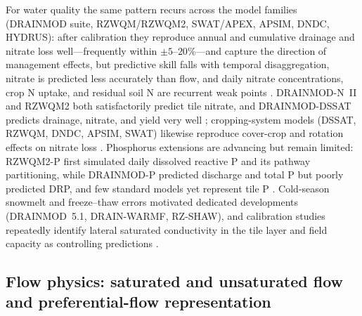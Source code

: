 \documentclass[11pt]{article}
\begin{document}
For water quality the same pattern recurs across the model families
(\textsc{DRAINMOD} suite, RZWQM/RZWQM2, SWAT/APEX, APSIM, DNDC, HYDRUS): after
calibration they reproduce annual and cumulative drainage and nitrate loss
well---frequently within $\pm5$--$20\%$---and capture the direction of
management effects, but predictive skill falls with temporal disaggregation,
nitrate is predicted less accurately than flow, and daily nitrate
concentrations, crop N uptake, and residual soil N are recurrent weak points
\parencite{Youssef2018,Negm2014,Singh2020b,Dayyani2010,Ma2001,Liang2018,Ikenberry2017,Marjerison2016,Ojeda2018,Qi2025,Ma2007,Ahuja2007}.
\textsc{DRAINMOD-N~II} and RZWQM2 both satisfactorily predict tile nitrate,
and \textsc{DRAINMOD-DSSAT} predicts drainage, nitrate, and yield very well
\parencite{Du2017,Qi2012,Negm2017,Singh2022c}; cropping-system models
(DSSAT, RZWQM, DNDC, APSIM, SWAT) likewise reproduce cover-crop and
rotation effects on nitrate loss \parencite{Jeong2018,Ahmed2007b,Ale2012b,Pasley2021,Motarjemi2021}.
Phosphorus extensions are advancing but remain limited: RZWQM2-P first
simulated daily dissolved reactive P and its pathway partitioning, while
\textsc{DRAINMOD-P} predicted discharge and total P but poorly predicted DRP,
and few standard models yet represent tile P
\parencite{Sadhukhan2019,Grewal2025,BinShokrana2023b,Askar2021,Askar2025,Radcliffe2015,Wang2020b}.
Cold-season snowmelt and freeze--thaw errors motivated dedicated developments
(\textsc{DRAINMOD}~5.1, DRAIN-WARMF, RZ-SHAW), and calibration studies
repeatedly identify lateral saturated conductivity in the tile layer and field
capacity as controlling predictions
\parencite{Wang2006c,Dayyani2010b,Li2024b,Ma2007c,Malone2017}.

\subsection{Flow physics: saturated and unsaturated flow and preferential-flow representation}
\end{document}
